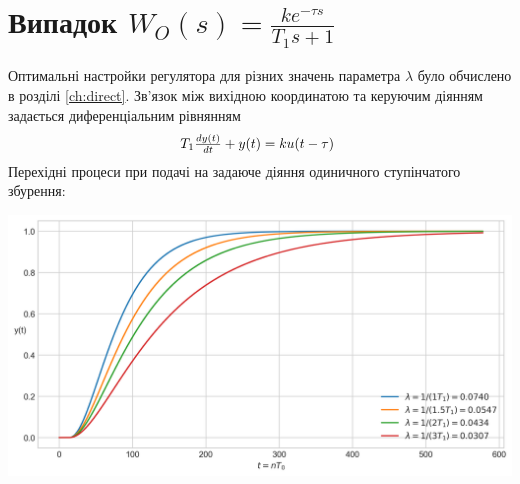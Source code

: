 \section{Випадок 
\texorpdfstring{$W_O(s) = \frac{ k e^{-\tau s}}{T_1 s + 1}$}{1}}
Оптимальні настройки регулятора для різних значень параметра $\lambda$ 
було обчислено в розділі \ref{ch:direct}.
Зв'язок між вихідною координатою та керуючим діянням задається диференціальним рівнянням
\begin{gather*}
    \mbox{\normalsize 
    $T_1 \frac{d y(t)}{dt} + y(t) = k u(t-\tau)$
    }
\end{gather*}
Перехідні процеси при подачі на задаюче діяння одиничного ступінчатого збурення:
\begin{center}
    \includegraphics[width=\textwidth]{pics/transient_process_final_9_3_step.png}
\end{center}